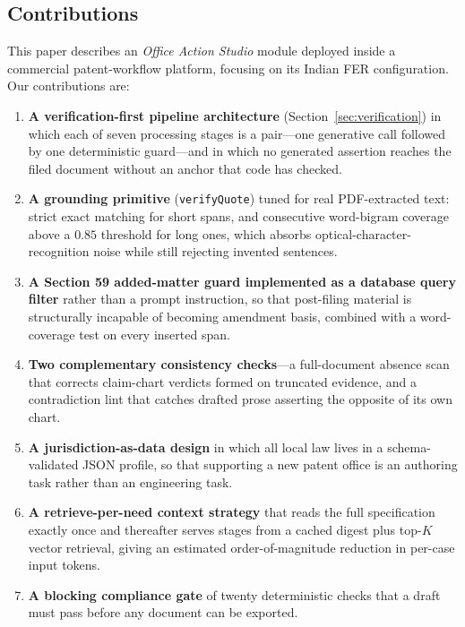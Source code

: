 \documentclass[conference]{IEEEtran}
\newcommand{\code}[1]{\texttt{\small #1}}
\begin{document}
\subsection{Contributions}

This paper describes an \emph{Office Action Studio} module deployed inside a commercial patent-workflow platform, focusing on its Indian FER configuration. Our contributions are:

\begin{enumerate}
\item \textbf{A verification-first pipeline architecture} (Section~\ref{sec:verification}) in which each of seven processing stages is a pair---one generative call followed by one deterministic guard---and in which no generated assertion reaches the filed document without an anchor that code has checked.
\item \textbf{A grounding primitive} (\code{verifyQuote}) tuned for real PDF-extracted text: strict exact matching for short spans, and consecutive word-bigram coverage above a $0.85$ threshold for long ones, which absorbs optical-character-recognition noise while still rejecting invented sentences.
\item \textbf{A Section 59 added-matter guard implemented as a database query filter} rather than a prompt instruction, so that post-filing material is structurally incapable of becoming amendment basis, combined with a word-coverage test on every inserted span.
\item \textbf{Two complementary consistency checks}---a full-document absence scan that corrects claim-chart verdicts formed on truncated evidence, and a contradiction lint that catches drafted prose asserting the opposite of its own chart.
\item \textbf{A jurisdiction-as-data design} in which all local law lives in a schema-validated JSON profile, so that supporting a new patent office is an authoring task rather than an engineering task.
\item \textbf{A retrieve-per-need context strategy} that reads the full specification exactly once and thereafter serves stages from a cached digest plus top-$K$ vector retrieval, giving an estimated order-of-magnitude reduction in per-case input tokens.
\item \textbf{A blocking compliance gate} of twenty deterministic checks that a draft must pass before any document can be exported.
\end{enumerate}

\end{document}
